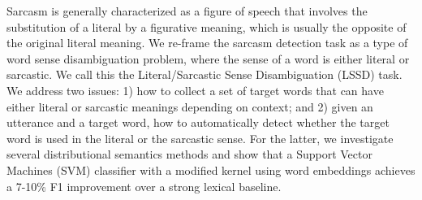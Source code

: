 Sarcasm is generally characterized as a figure of speech that involves the substitution of a literal by a figurative meaning, which is usually the opposite of the original literal meaning. We re-frame the sarcasm detection task as a type of word sense disambiguation problem, where the sense of a word is either literal or sarcastic. We call this the Literal/Sarcastic Sense Disambiguation (LSSD) task. We address two issues: 1) how to collect a set of target words that  can have either literal or sarcastic meanings depending on context; and 2) given an utterance and a target word, how to automatically detect whether the target word is used in the literal or the sarcastic sense. For the latter, we investigate several distributional semantics methods and show that a Support Vector Machines (SVM) classifier with a modified kernel using word embeddings achieves a 7-10\% F1 improvement over a strong lexical baseline.
